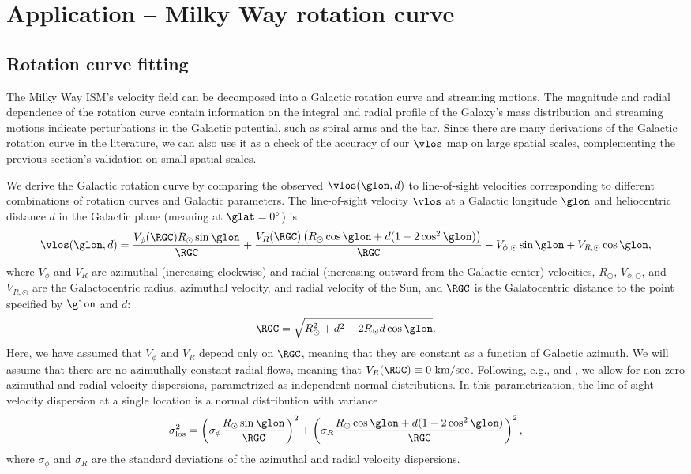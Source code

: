\section{Application -- Milky Way rotation curve}
\label{sec:rotation_curve}

\subsection{Rotation curve fitting}
\label{sec:rotation_fit}
The Milky Way ISM's velocity field can be decomposed into a Galactic rotation curve and streaming motions. 
The magnitude and radial dependence of the rotation curve contain information on the integral and radial profile of the Galaxy's mass distribution and streaming motions indicate perturbations in the Galactic potential, such as spiral arms and the bar.
Since there are many derivations of the Galactic rotation curve in the literature, we can also use it as a check of the accuracy of our $\vlos$ map on large spatial scales, complementing the previous section's validation on small spatial scales.

We derive the Galactic rotation curve by comparing the observed $\vlos(\glon, d)$ to line-of-sight velocities corresponding to different combinations of rotation curves and Galactic parameters. 
The line-of-sight velocity $\vlos$ at a Galactic longitude $\glon$ and heliocentric distance $d$ in the Galactic plane (meaning at $\glat=0^\circ$) is 
\begin{equation}
\label{eqn:vlos_mean}
\vlos(\glon, d) = \frac{V_\phi (\RGC) R_\odot \sin\glon}{\RGC} + 
\frac{V_R (\RGC) \left(R_\odot \cos \glon + d (1 - 2 \cos^2 \glon)  \right) }{\RGC} - V_{\phi, \odot} \sin \glon + V_{R, \odot} \cos \glon,
\end{equation}
where $V_\phi$ and $V_R$ are azimuthal (increasing clockwise) and radial (increasing outward from the Galactic center) velocities, $R_\odot$, $V_{\phi, \odot}$, and $V_{R, \odot}$ are the Galactocentric radius, azimuthal velocity, and radial velocity of the Sun, and $\RGC$ is the Galatocentric distance to the point specified by $\glon$ and $d$:
\begin{equation}
\RGC = \sqrt{R^2_\odot + d^2 - 2 R_\odot d \cos \glon}.
\end{equation}
Here, we have assumed that $V_\phi$ and $V_R$ depend only on $\RGC$, meaning that they are constant as a function of Galactic azimuth.
We will assume that there are no azimuthally constant radial flows, meaning that $V_R(\RGC) \equiv 0\text{ km/sec}$.
Following, e.g., \citet{Reid:2009jb} and \citet{Bovy_2009}, we allow for non-zero azimuthal and radial velocity dispersions, parametrized as independent normal distributions. 
In this parametrization, the line-of-sight velocity dispersion at a single location is a normal distribution with variance
\begin{equation}
\label{eqn:vlos_var}
\sigma^2_\mathrm{los} = \left(\sigma_\phi \frac{R_\odot \sin \glon}{\RGC} \right)^2 + 
\left(\sigma_R  \frac{R_\odot \cos \glon + d (1 - 2 \cos^2 \glon)}{\RGC} \right)^2,
\end{equation}
where $\sigma_\phi$ and $\sigma_R$ are the standard deviations of the azimuthal and radial velocity dispersions. 

